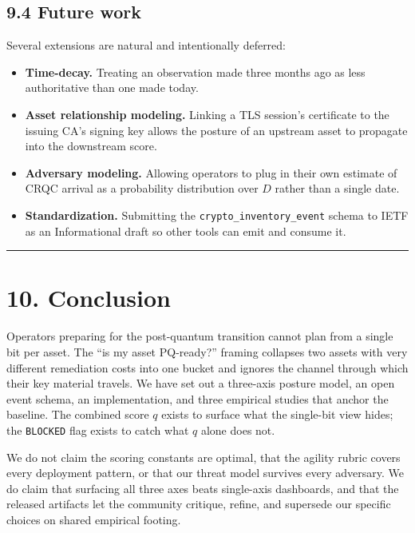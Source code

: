 \subsection{9.4 Future work}\label{future-work}

Several extensions are natural and intentionally deferred:

\begin{itemize}
\tightlist
\item
  \textbf{Time-decay.} Treating an observation made three months ago as
  less authoritative than one made today.
\item
  \textbf{Asset relationship modeling.} Linking a TLS session's
  certificate to the issuing CA's signing key allows the posture of an
  upstream asset to propagate into the downstream score.
\item
  \textbf{Adversary modeling.} Allowing operators to plug in their own
  estimate of CRQC arrival as a probability distribution over \(D\)
  rather than a single date.
\item
  \textbf{Standardization.} Submitting the
  \texttt{crypto\_inventory\_event} schema to IETF as an Informational
  draft so other tools can emit and consume it.
\end{itemize}

\begin{center}\rule{0.5\linewidth}{0.5pt}\end{center}

\section{10. Conclusion}\label{conclusion}

Operators preparing for the post-quantum transition cannot plan from a
single bit per asset. The ``is my asset PQ-ready?'' framing collapses
two assets with very different remediation costs into one bucket and
ignores the channel through which their key material travels. We have
set out a three-axis posture model, an open event schema, an
implementation, and three empirical studies that anchor the baseline.
The combined score \(q\) exists to surface what the single-bit view
hides; the \texttt{BLOCKED} flag exists to catch what \(q\) alone does
not.

We do not claim the scoring constants are optimal, that the agility
rubric covers every deployment pattern, or that our threat model
survives every adversary. We do claim that surfacing all three axes
beats single-axis dashboards, and that the released artifacts let the
community critique, refine, and supersede our specific choices on shared
empirical footing.

